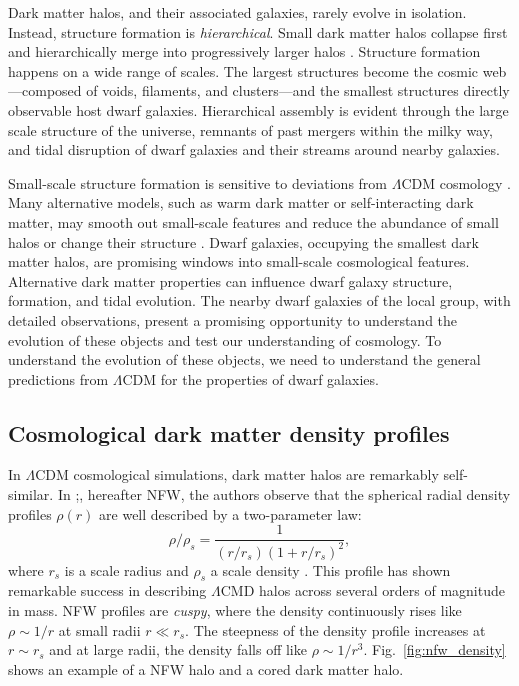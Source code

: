 Dark matter halos, and their associated galaxies, rarely evolve in
isolation. Instead, structure formation is \emph{hierarchical}. Small
dark matter halos collapse first and hierarchically merge into
progressively larger halos \citep[e.g.][\citet{blumenthal+1986},
\citet{white+rees1978}, \citet{white+frenk1991},
\citet{somerville+dave2015}]{blumenthal+1984}. Structure formation
happens on a wide range of scales. The largest structures become the
cosmic web---composed of voids, filaments, and clusters---and the
smallest structures directly observable host dwarf galaxies.
Hierarchical assembly is evident through the large scale structure of
the universe, remnants of past mergers within the milky way, and tidal
disruption of dwarf galaxies and their streams around nearby galaxies.

Small-scale structure formation is sensitive to deviations from
\(\Lambda\)CDM cosmology \citep[e.g.][]{bechtol+2022}. Many alternative
models, such as warm dark matter or self-interacting dark matter, may
smooth out small-scale features and reduce the abundance of small halos
or change their structure \citep[e.g.][]{lovell+2014}. Dwarf galaxies,
occupying the smallest dark matter halos, are promising windows into
small-scale cosmological features. Alternative dark matter properties
can influence dwarf galaxy structure, formation, and tidal evolution.
The nearby dwarf galaxies of the local group, with detailed
observations, present a promising opportunity to understand the
evolution of these objects and test our understanding of cosmology. To
understand the evolution of these objects, we need to understand the
general predictions from \(\Lambda\)CDM for the properties of dwarf
galaxies.

\subsection{Cosmological dark matter density
profiles}\label{cosmological-dark-matter-density-profiles}

In \(\Lambda\)CDM cosmological simulations, dark matter halos are
remarkably self-similar. In \citet{NFW1996};\citet{NFW1997}, hereafter
NFW, the authors observe that the spherical radial density profiles
\(\rho(r)\) are well described by a two-parameter law: \begin{equation}{
\rho/\rho_s= \frac{1}{(r/r_s)(1+r/r_s)^2},
}\end{equation} where \(r_s\) is a scale radius and \(\rho_s\) a scale
density . This profile has shown remarkable success in describing
\(\Lambda\)CMD halos across several orders of magnitude in mass. NFW
profiles are \emph{cuspy}, where the density continuously rises like
\(\rho \sim 1/r\) at small radii \(r \ll r_s\). The steepness of the
density profile increases at \(r \sim r_s\) and at large radii, the
density falls off like \(\rho \sim 1/r^3\). Fig.~\ref{fig:nfw_density}
shows an example of a NFW halo and a cored dark matter halo.

